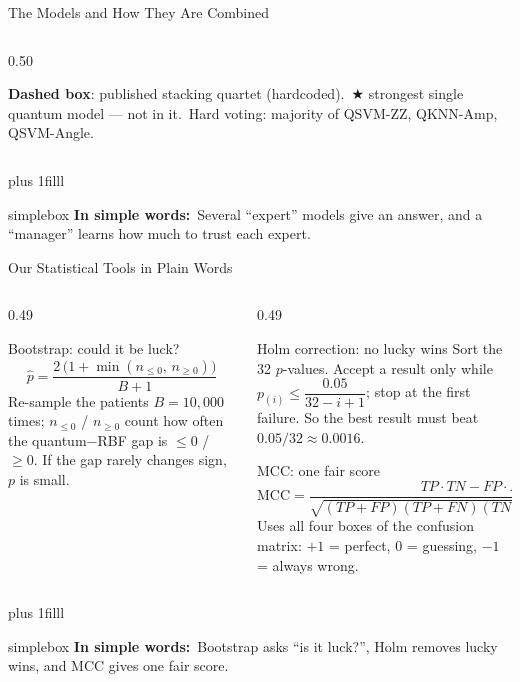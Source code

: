 \documentclass[aspectratio=169,11pt,t,xcolor={table}]{beamer}
\newcommand{\tightdisplay}{\setlength{\abovedisplayskip}{2pt}\setlength{\belowdisplayskip}{2pt}%
  \setlength{\abovedisplayshortskip}{1pt}\setlength{\belowdisplayshortskip}{1pt}}
\newcommand{\insimple}[1]{%
  \par\vskip 0pt plus 1filll
  \begin{beamercolorbox}[wd=\textwidth,sep=4pt,rounded=true]{simplebox}%
    \small\textbf{\textcolor{qamber!75!black}{In simple words:}}\ #1%
  \end{beamercolorbox}\vskip1pt}
\begin{document}
\begin{frame}{The Models and How They Are Combined}
\begin{columns}[T,onlytextwidth]
\begin{column}{0.50\textwidth}
      {\tiny \textcolor{qnavy}{\textbf{Dashed box}}: published stacking quartet (hardcoded).\ $\bigstar$ strongest single quantum model --- not in it.\ Hard voting: majority of QSVM-ZZ, QKNN-Amp, QSVM-Angle.\par}
    \end{column}
  \end{columns}
  \insimple{Several ``expert'' models give an answer, and a ``manager'' learns how much to trust each expert.}
\end{frame}

\begin{frame}{Our Statistical Tools in Plain Words}
  \begin{columns}[T,onlytextwidth]
    \begin{column}{0.49\textwidth}
      \begin{block}{Bootstrap: could it be luck?}
        \footnotesize\tightdisplay
        \[\hat p=\frac{2\,\big(1+\min(n_{\le 0},\,n_{\ge 0})\big)}{B+1}\]
        Re-sample the patients $B=10{,}000$ times; $n_{\le0}$ / $n_{\ge0}$ count how often the quantum$-$RBF gap is $\le 0$ / $\ge 0$. If the gap rarely changes sign, $p$ is small.
      \end{block}
    \end{column}
    \begin{column}{0.49\textwidth}
      \begin{block}{Holm correction: no lucky wins}
        \footnotesize
        Sort the 32 $p$-values. Accept a result only while $p_{(i)}\le\dfrac{0.05}{32-i+1}$; stop at the first failure.
        So the best result must beat $0.05/32\approx0.0016$.
      \end{block}
      \begin{block}{MCC: one fair score}
        \footnotesize\tightdisplay
        \[\mathrm{MCC}=\frac{TP\cdot TN-FP\cdot FN}{\sqrt{(TP{+}FP)(TP{+}FN)(TN{+}FP)(TN{+}FN)}}\]
        Uses all four boxes of the confusion matrix: $+1$ = perfect, $0$ = guessing, $-1$ = always wrong.
      \end{block}
    \end{column}
  \end{columns}
  \insimple{Bootstrap asks ``is it luck?'', Holm removes lucky wins, and MCC gives one fair score.}
\end{frame}
\end{document}
